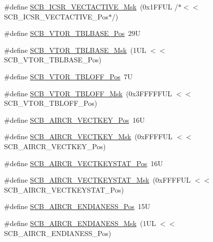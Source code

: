 \begin{DoxyCompactItemize}
\#define \mbox{\hyperlink{group___c_m_s_i_s___s_c_b_ga5533791a4ecf1b9301c883047b3e8396}{S\+C\+B\+\_\+\+I\+C\+S\+R\+\_\+\+V\+E\+C\+T\+A\+C\+T\+I\+V\+E\+\_\+\+Msk}}~(0x1\+F\+F\+U\+L /$\ast$$<$$<$ S\+C\+B\+\_\+\+I\+C\+S\+R\+\_\+\+V\+E\+C\+T\+A\+C\+T\+I\+V\+E\+\_\+\+Pos$\ast$/)
\item 
\#define \mbox{\hyperlink{group___c_m_s_i_s___s_c_b_gad9720a44320c053883d03b883b955751}{S\+C\+B\+\_\+\+V\+T\+O\+R\+\_\+\+T\+B\+L\+B\+A\+S\+E\+\_\+\+Pos}}~29U
\item 
\#define \mbox{\hyperlink{group___c_m_s_i_s___s_c_b_ga778dd0ba178466b2a8877a6b8aa345ee}{S\+C\+B\+\_\+\+V\+T\+O\+R\+\_\+\+T\+B\+L\+B\+A\+S\+E\+\_\+\+Msk}}~(1\+U\+L $<$$<$ S\+C\+B\+\_\+\+V\+T\+O\+R\+\_\+\+T\+B\+L\+B\+A\+S\+E\+\_\+\+Pos)
\item 
\#define \mbox{\hyperlink{group___c_m_s_i_s___s_c_b_gac6a55451ddd38bffcff5a211d29cea78}{S\+C\+B\+\_\+\+V\+T\+O\+R\+\_\+\+T\+B\+L\+O\+F\+F\+\_\+\+Pos}}~7U
\item 
\#define \mbox{\hyperlink{group___c_m_s_i_s___s_c_b_ga75e395ed74042923e8c93edf50f0996c}{S\+C\+B\+\_\+\+V\+T\+O\+R\+\_\+\+T\+B\+L\+O\+F\+F\+\_\+\+Msk}}~(0x3\+F\+F\+F\+F\+F\+U\+L $<$$<$ S\+C\+B\+\_\+\+V\+T\+O\+R\+\_\+\+T\+B\+L\+O\+F\+F\+\_\+\+Pos)
\item 
\#define \mbox{\hyperlink{group___c_m_s_i_s___s_c_b_gaaa27c0ba600bf82c3da08c748845b640}{S\+C\+B\+\_\+\+A\+I\+R\+C\+R\+\_\+\+V\+E\+C\+T\+K\+E\+Y\+\_\+\+Pos}}~16U
\item 
\#define \mbox{\hyperlink{group___c_m_s_i_s___s_c_b_ga90c7cf0c490e7ae55f9503a7fda1dd22}{S\+C\+B\+\_\+\+A\+I\+R\+C\+R\+\_\+\+V\+E\+C\+T\+K\+E\+Y\+\_\+\+Msk}}~(0x\+F\+F\+F\+F\+U\+L $<$$<$ S\+C\+B\+\_\+\+A\+I\+R\+C\+R\+\_\+\+V\+E\+C\+T\+K\+E\+Y\+\_\+\+Pos)
\item 
\#define \mbox{\hyperlink{group___c_m_s_i_s___s_c_b_gaec404750ff5ca07f499a3c06b62051ef}{S\+C\+B\+\_\+\+A\+I\+R\+C\+R\+\_\+\+V\+E\+C\+T\+K\+E\+Y\+S\+T\+A\+T\+\_\+\+Pos}}~16U
\item 
\#define \mbox{\hyperlink{group___c_m_s_i_s___s_c_b_gabacedaefeefc73d666bbe59ece904493}{S\+C\+B\+\_\+\+A\+I\+R\+C\+R\+\_\+\+V\+E\+C\+T\+K\+E\+Y\+S\+T\+A\+T\+\_\+\+Msk}}~(0x\+F\+F\+F\+F\+U\+L $<$$<$ S\+C\+B\+\_\+\+A\+I\+R\+C\+R\+\_\+\+V\+E\+C\+T\+K\+E\+Y\+S\+T\+A\+T\+\_\+\+Pos)
\item 
\#define \mbox{\hyperlink{group___c_m_s_i_s___s_c_b_gad31dec98fbc0d33ace63cb1f1a927923}{S\+C\+B\+\_\+\+A\+I\+R\+C\+R\+\_\+\+E\+N\+D\+I\+A\+N\+E\+S\+S\+\_\+\+Pos}}~15U
\item 
\#define \mbox{\hyperlink{group___c_m_s_i_s___s_c_b_ga2f571f93d3d4a6eac9a3040756d3d951}{S\+C\+B\+\_\+\+A\+I\+R\+C\+R\+\_\+\+E\+N\+D\+I\+A\+N\+E\+S\+S\+\_\+\+Msk}}~(1\+U\+L $<$$<$ S\+C\+B\+\_\+\+A\+I\+R\+C\+R\+\_\+\+E\+N\+D\+I\+A\+N\+E\+S\+S\+\_\+\+Pos)
$$
\end{DoxyCompactItemize}
